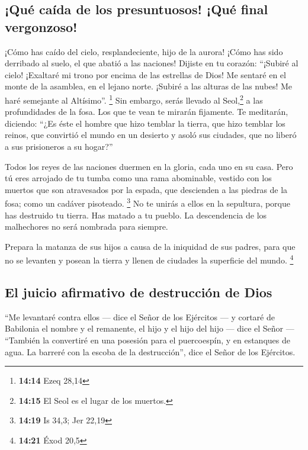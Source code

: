 \begin{paracol}{2}
\hypertarget{quuxe9-cauxedda-de-los-presuntuosos-quuxe9-final-vergonzoso}{%
\subsection{¡Qué caída de los presuntuosos! ¡Qué final
vergonzoso!}\label{quuxe9-cauxedda-de-los-presuntuosos-quuxe9-final-vergonzoso}}

 ¡Cómo has caído del cielo, resplandeciente, hijo de la
aurora! ¡Cómo has sido derribado al suelo, el que abatió a las naciones!
 Dijiste en tu corazón: ``¡Subiré al cielo! ¡Exaltaré mi
trono por encima de las estrellas de Dios! Me sentaré en el monte de la
asamblea, en el lejano norte.  ¡Subiré a las alturas de
las nubes! Me haré semejante al Altísimo''. \footnote{\textbf{14:14}
  Ezeq 28,14}  Sin embargo, serás llevado al
Seol,\footnote{\textbf{14:15} El Seol es el lugar de los muertos.} a las
profundidades de la fosa.  Los que te vean te mirarán
fijamente. Te meditarán, diciendo: ``¿Es éste el hombre que hizo temblar
la tierra, que hizo temblar los reinos,  que convirtió el
mundo en un desierto y asoló sus ciudades, que no liberó a sus
prisioneros a su hogar?''

 Todos los reyes de las naciones duermen en la gloria,
cada uno en su casa.  Pero tú eres arrojado de tu tumba
como una rama abominable, vestido con los muertos que son atravesados
por la espada, que descienden a las piedras de la fosa; como un cadáver
pisoteado. \footnote{\textbf{14:19} Is 34,3; Jer 22,19} 
No te unirás a ellos en la sepultura, porque has destruido tu tierra.
Has matado a tu pueblo. La descendencia de los malhechores no será
nombrada para siempre.

 Prepara la matanza de sus hijos a causa de la iniquidad
de sus padres, para que no se levanten y posean la tierra y llenen de
ciudades la superficie del mundo. \footnote{\textbf{14:21} Éxod 20,5}

\hypertarget{el-juicio-afirmativo-de-destrucciuxf3n-de-dios}{%
\subsection{El juicio afirmativo de destrucción de
Dios}\label{el-juicio-afirmativo-de-destrucciuxf3n-de-dios}}

 ``Me levantaré contra ellos --- dice el Señor de los
Ejércitos --- y cortaré de Babilonia el nombre y el remanente, el hijo y
el hijo del hijo --- dice el Señor ---  ``También la
convertiré en una posesión para el puercoespín, y en estanques de agua.
La barreré con la escoba de la destrucción'', dice el Señor de los
Ejércitos.


\end{paracol}
